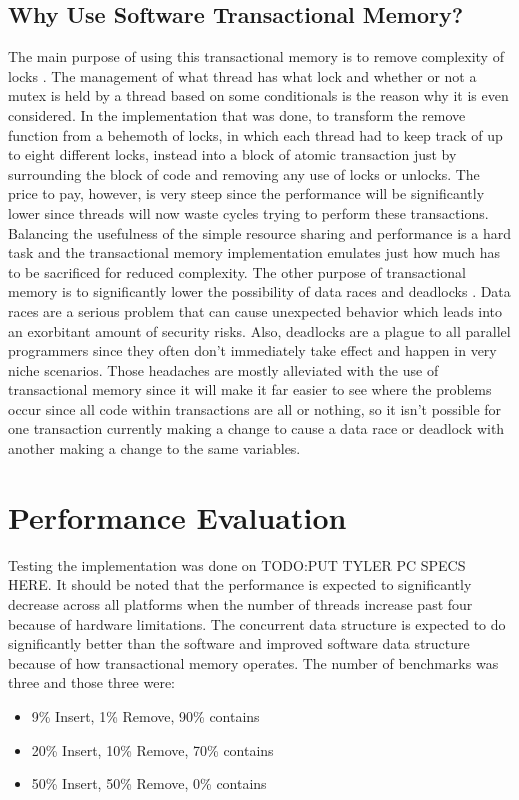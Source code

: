 \documentclass[conference]{IEEEtran}
\begin{document}
\subsection{Why Use Software Transactional Memory?}
The main purpose of using this transactional memory is to remove complexity of locks \cite{b4}. The management of what thread has what lock and whether or not a mutex is held by a thread based on some conditionals is the reason why it is even considered. In the implementation that was done, to transform the remove function from a behemoth of locks, in which each thread had to keep track of up to eight different locks, instead into a block of atomic transaction just by surrounding the block of code and removing any use of locks or unlocks. The price to pay, however, is very steep since the performance will be significantly lower since threads will now waste cycles trying to perform these transactions. Balancing the usefulness of the simple resource sharing and performance is a hard task and the transactional memory implementation emulates just how much has to be sacrificed for reduced complexity. The other purpose of transactional memory is to significantly lower the possibility of data races and deadlocks \cite{b4}. Data races are a serious problem that can cause unexpected behavior which leads into an exorbitant amount of security risks. Also, deadlocks are a plague to all parallel programmers since they often don't immediately take effect and happen in very niche scenarios. Those headaches are mostly alleviated with the use of transactional memory since it will make it far easier to see where the problems occur since all code within transactions are all or nothing, so it isn't possible for one transaction currently making a change to cause a data race or deadlock with another making a change to the same variables.
\section{Performance Evaluation}

Testing the implementation was done on TODO:PUT TYLER PC SPECS HERE. It should be noted that the performance is expected to significantly decrease across all platforms when the number of threads increase past four because of hardware limitations. The concurrent data structure is expected to do significantly better than the software and improved software data structure because of how transactional memory operates. The number of benchmarks was three and those three were:
\begin{itemize}
\item 9\% Insert, 1\% Remove, 90\% contains
\item 20\% Insert, 10\% Remove, 70\% contains
\item 50\% Insert, 50\% Remove, 0\% contains
\end{itemize}
\end{document}
